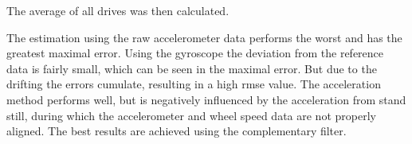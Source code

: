 The average of all drives was then calculated.\par
The estimation using the raw accelerometer data performs the worst and has the greatest maximal error.
Using the gyroscope the deviation from the reference data is fairly small, which can be seen in the maximal error.
But due to the drifting the errors cumulate, resulting in a high \gls{rmse} value.
The acceleration method performs well, but is negatively influenced by the acceleration from stand still, during which the accelerometer and wheel speed data are not properly aligned.
The best results are achieved using the complementary filter.
\begin{table}[htb]
    \centering
    \caption[Road grade estimation for uphill drives]{Road grade estimation when driving ramps up, using different methods.}
    \label{tab:eval_imu_up}
\end{table}
